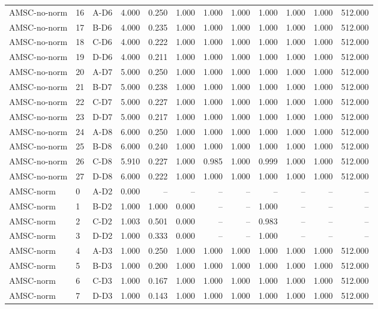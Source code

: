 \begin{table}[ht]
\begin{tabular}{lllrrrrrrrrr}
AMSC-no-norm & 16 & A-D6 & 4.000 & 0.250 & 1.000 & 1.000 & 1.000 & 1.000 & 1.000 & 1.000 & 512.000 \\
AMSC-no-norm & 17 & B-D6 & 4.000 & 0.235 & 1.000 & 1.000 & 1.000 & 1.000 & 1.000 & 1.000 & 512.000 \\
AMSC-no-norm & 18 & C-D6 & 4.000 & 0.222 & 1.000 & 1.000 & 1.000 & 1.000 & 1.000 & 1.000 & 512.000 \\
AMSC-no-norm & 19 & D-D6 & 4.000 & 0.211 & 1.000 & 1.000 & 1.000 & 1.000 & 1.000 & 1.000 & 512.000 \\
AMSC-no-norm & 20 & A-D7 & 5.000 & 0.250 & 1.000 & 1.000 & 1.000 & 1.000 & 1.000 & 1.000 & 512.000 \\
AMSC-no-norm & 21 & B-D7 & 5.000 & 0.238 & 1.000 & 1.000 & 1.000 & 1.000 & 1.000 & 1.000 & 512.000 \\
AMSC-no-norm & 22 & C-D7 & 5.000 & 0.227 & 1.000 & 1.000 & 1.000 & 1.000 & 1.000 & 1.000 & 512.000 \\
AMSC-no-norm & 23 & D-D7 & 5.000 & 0.217 & 1.000 & 1.000 & 1.000 & 1.000 & 1.000 & 1.000 & 512.000 \\
AMSC-no-norm & 24 & A-D8 & 6.000 & 0.250 & 1.000 & 1.000 & 1.000 & 1.000 & 1.000 & 1.000 & 512.000 \\
AMSC-no-norm & 25 & B-D8 & 6.000 & 0.240 & 1.000 & 1.000 & 1.000 & 1.000 & 1.000 & 1.000 & 512.000 \\
AMSC-no-norm & 26 & C-D8 & 5.910 & 0.227 & 1.000 & 0.985 & 1.000 & 0.999 & 1.000 & 1.000 & 512.000 \\
AMSC-no-norm & 27 & D-D8 & 6.000 & 0.222 & 1.000 & 1.000 & 1.000 & 1.000 & 1.000 & 1.000 & 512.000 \\
AMSC-norm & 0 & A-D2 & 0.000 & -- & -- & -- & -- & -- & -- & -- & -- \\
AMSC-norm & 1 & B-D2 & 1.000 & 1.000 & 0.000 & -- & -- & 1.000 & -- & -- & -- \\
AMSC-norm & 2 & C-D2 & 1.003 & 0.501 & 0.000 & -- & -- & 0.983 & -- & -- & -- \\
AMSC-norm & 3 & D-D2 & 1.000 & 0.333 & 0.000 & -- & -- & 1.000 & -- & -- & -- \\
AMSC-norm & 4 & A-D3 & 1.000 & 0.250 & 1.000 & 1.000 & 1.000 & 1.000 & 1.000 & 1.000 & 512.000 \\
AMSC-norm & 5 & B-D3 & 1.000 & 0.200 & 1.000 & 1.000 & 1.000 & 1.000 & 1.000 & 1.000 & 512.000 \\
AMSC-norm & 6 & C-D3 & 1.000 & 0.167 & 1.000 & 1.000 & 1.000 & 1.000 & 1.000 & 1.000 & 512.000 \\
AMSC-norm & 7 & D-D3 & 1.000 & 0.143 & 1.000 & 1.000 & 1.000 & 1.000 & 1.000 & 1.000 & 512.000 \\

\end{tabular}
\end{table}
